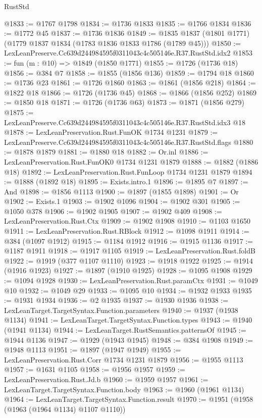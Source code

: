 \begin{lexlean}{RustStd}
\begin{coremodule}
@1833 := @1767 @1798
@1834 := @1736 @1833
@1835 := @1766 @1834
@1836 := @1772 @45
@1837 := @1736 @1836
@1849 := @1835 @1837 (@1801 @1771) (@1779 @1837 @1834 (@1783 @1836 @1833 @1786 (@1789 @45)))
@1850 := LexLeanPreserve.Cc639d244984595f0311043c4c505146e.R37.RustStd.idx2
@1853 := fun (m : @10) => @1849 (@1850 @1771)
@1855 := @1726 (@1736 @18)
@1856 := @384 @7
@1858 := @1855 (@1856 @136)
@1859 := @1794 @18
@1860 := @1736 @23
@1861 := @1726 @1860
@1863 := @1861 (@1856 @218)
@1864 := @1822 @18
@1866 := @1726 (@1736 @45)
@1868 := @1866 (@1856 @252)
@1869 := @1850 @18
@1871 := @1726 (@1736 @63)
@1873 := @1871 (@1856 @279)
@1875 := LexLeanPreserve.Cc639d244984595f0311043c4c505146e.R37.RustStd.idx3 @18
@1878 := LexLeanPreservation.Rust.FunOK @1734 @1231
@1879 := LexLeanPreserve.Cc639d244984595f0311043c4c505146e.R37.RustStd.flags
@1880 := @1878 @1879
@1881 := @1880 @18
@1882 := Or.inl
@1886 := LexLeanPreservation.Rust.FunOK0 @1734 @1231 @1879
@1888 := @1882 (@1886 @18)
@1892 := LexLeanPreservation.Rust.FunLoop @1734 @1231 @1879
@1894 := @1888 (@1892 @18)
@1895 := Exists.intro.{1}
@1896 := @1895 @7
@1897 := And
@1898 := @1856 @1113
@1900 := @1897 (@1855 @1898)
@1901 := Or
@1902 := Exists.{1}
@1903 := @1902 @1096
@1904 := @1902 @301
@1905 := @1050 @378
@1906 := @1902 @1905
@1907 := @1902 @409
@1908 := LexLeanPreservation.Rust.Ctx
@1909 := @1902 @1908
@1910 := @1103 @1650
@1911 := LexLeanPreservation.Rust.RBlock
@1912 := @1098 @1911
@1914 := @384 (@1097 @1912)
@1915 := @1184 @1912
@1916 := @1915 @1136
@1917 := @1187 @1911
@1918 := @1917 @1105
@1919 := LexLeanPreservation.Rust.foldB
@1922 := @1919 (@377 @1107 @1110)
@1923 := @1918 @1922
@1925 := @1914 (@1916 @1923)
@1927 := @1897 (@1910 @1925)
@1928 := @1095 @1908
@1929 := @1094 @1928
@1930 := LexLeanPreservation.Rust.paramCtx
@1931 := @1049 @10
@1932 := @1049 @29
@1933 := @1095 @10
@1934 := @1932 @1933
@1935 := @1931 @1934
@1936 := @2 @1935
@1937 := @1930 @1936
@1938 := LexLeanTarget.TargetSyntax.Function.parameters
@1940 := @1937 (@1938 @1134)
@1941 := LexLeanTarget.TargetSyntax.Function.types
@1943 := @1940 (@1941 @1134)
@1944 := LexLeanTarget.RustSemantics.patternsOf
@1945 := @1944 @1136
@1947 := @1929 (@1943 @1945)
@1948 := @384 @1908
@1949 := @1948 @1113
@1951 := @1897 (@1947 @1949)
@1955 := LexLeanPreservation.Rust.Corr @1734 @1231 @1879
@1956 := @1955 @1113
@1957 := @1631 @1105
@1958 := @1956 @1957
@1959 := LexLeanPreservation.Rust.Jd.b
@1960 := @1959 @1957
@1961 := LexLeanTarget.TargetSyntax.Function.body
@1963 := @1960 (@1961 @1134)
@1964 := LexLeanTarget.TargetSyntax.Function.result
@1970 := @1951 (@1958 (@1963 (@1964 @1134) @1107 @1110))

\end{coremodule}
\end{lexlean}

